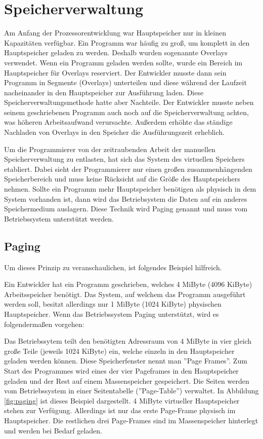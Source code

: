 \documentclass[a4paper,12pt]{article}
\begin{document}
\section{Speicherverwaltung}
Am Anfang der Prozessorentwicklung war Hauptspeicher nur in kleinen Kapazitäten verfügbar. Ein Programm war häufig zu groß, um komplett in den Hauptspeicher geladen zu werden. Deshalb wurden sogenannte Overlays verwendet. Wenn ein Programm geladen werden sollte, wurde ein Bereich im Hauptspeicher für Overlays reserviert. Der Entwickler musste dann sein Programm in Segmente (Overlays) unterteilen und diese während der Laufzeit nacheinander in den Hauptspeicher zur Ausführung laden. Diese Speicherverwaltungsmethode hatte aber Nachteile. Der Entwickler musste neben seinem geschriebenen Programm auch noch auf die Speicherverwaltung achten, was höheren Arbeitsaufwand verursachte. Außerdem erhöhte das ständige Nachladen von Overlays in den Speicher die Ausführungszeit erheblich. \cite[S.173]{mikroprozessortechnik2011}


Um die Programmierer von der zeitraubenden Arbeit der manuellen Speicherverwaltung zu entlasten, hat sich das System des virtuellen Speichers etabliert. Dabei sieht der Programmierer nur einen großen zusammenhängenden Speicherbereich und muss keine Rücksicht auf die Größe des Hauptspeichers nehmen. Sollte ein Programm mehr Hauptspeicher benötigen als physisch in dem System vorhanden ist, dann wird das Betriebsystem die Daten auf ein anderes Speichermedium auslagern. Diese Technik wird Paging genannt und muss vom Betriebssystem unterstützt werden.

\subsection{Paging}
Um dieses Prinzip zu veranschaulichen, ist folgendes Beispiel hilfreich. 
\par\smallskip\noindent Ein Entwickler hat ein Programm geschrieben, welches 4 MiByte (4096 KiByte) Arbeitsspeicher benötigt. Das System, auf welchem das Programm ausgeführt werden soll, besitzt allerdings nur 1 MiByte (1024 KiByte) physischen Hauptspeicher. Wenn das Betriebssystem Paging unterstützt, wird es folgendermaßen vorgehen:
\par\smallskip\noindent Das Betriebssytem teilt den benötigten Adressraum von 4 MiByte in vier gleich große Teile (jeweils 1024 KiByte) ein, welche einzeln in den Hauptspeicher geladen werden können. Diese Speicherfenster nennt man ''Page Frames''. Zum Start des Programmes wird eines der vier Pageframes in den Hauptspeicher geladen und der Rest auf einem Massenspeicher gespeichert. Die Seiten werden vom Betriebssystem in einer Seitentabelle (''Page-Table'') verwaltet.  In Abbildung \ref{fig:paging} ist dieses Beispiel dargestellt. 4 MiByte virtueller Hauptspeicher stehen zur Verfügung. Allerdings ist nur das erste Page-Frame physisch im Hauptspeicher. Die restlichen drei Page-Frames sind im Massenspeicher hinterlegt und werden bei Bedarf geladen.
\end{document}
